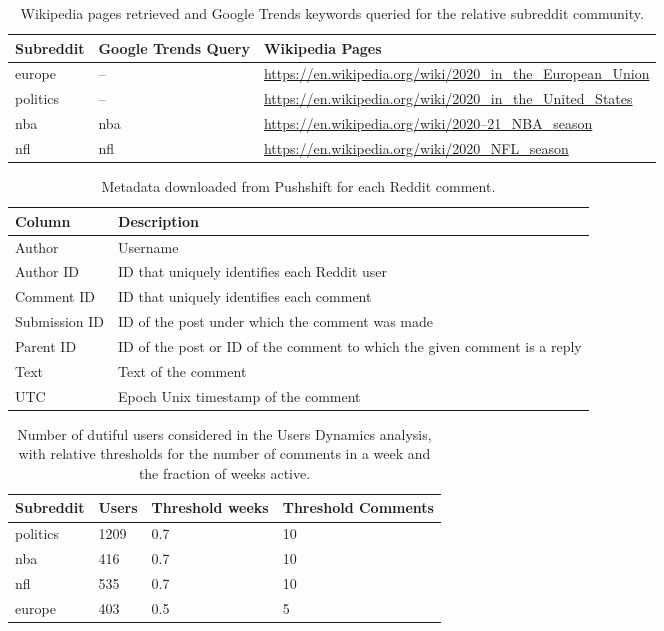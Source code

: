 \documentclass[fleqn,10pt]{wlscirep}
\begin{document}
%
\begin{table}[h!]
	\centering
    \begin{tabular}{lll}
    \toprule
    {\textbf{Subreddit}} & {\textbf{Google Trends Query}} & {\textbf{Wikipedia Pages}}\\
    \midrule
       europe & -- & \url{https://en.wikipedia.org/wiki/2020_in_the_European_Union} \\
     politics & -- & \url{https://en.wikipedia.org/wiki/2020_in_the_United_States} \\
      nba & nba &          \url{https://en.wikipedia.org/wiki/2020–21_NBA_season} \\
      nfl & nfl &              \url{https://en.wikipedia.org/wiki/2020_NFL_season} \\
    \bottomrule
    \end{tabular}
    \caption{Wikipedia pages retrieved and Google Trends keywords queried for the relative subreddit community.} 
\label{tab_sm_data_pages}
\end{table}
%
\begin{table}[h!]
	\centering
	\begin{tabular}{lp{}}
		\toprule
		{\textbf{Column}} & {\textbf{Description}}\\
		\midrule
		Author &  Username\\
		Author ID & ID that uniquely identifies each Reddit user\\
		Comment ID & ID that uniquely identifies each comment\\
		Submission ID &	ID of the post under which the comment was made\\
		Parent ID &	ID of the post or ID of the comment to which the given comment is a reply\\
		Text & Text of the comment\\
		UTC & Epoch Unix timestamp of the comment\\
		\hline 
	\end{tabular}
\caption{Metadata downloaded from Pushshift for each Reddit comment.} 
\label{tab_sm_data_comments}
\end{table}
%
\begin{table}[h!]
	\centering
	\begin{tabular}{llll}
		\toprule
        {\textbf{Subreddit}} & {\textbf{Users}} & {\textbf{Threshold weeks}} & {\textbf{Threshold Comments}}\\
        \midrule
        politics & 1209 & 0.7 & 10\\
        nba & 416 & 0.7 & 10\\
        nfl & 535 & 0.7 & 10\\
        europe & 403 & 0.5 & 5\\
        \hline 
	\end{tabular}
    \caption{Number of dutiful users considered in the Users Dynamics analysis, with relative thresholds for the number of comments in a week and the fraction of weeks active.} 
\label{tab_sm_users_ud}
\end{table}
\pagebreak[2]
\clearpage
\end{document}
